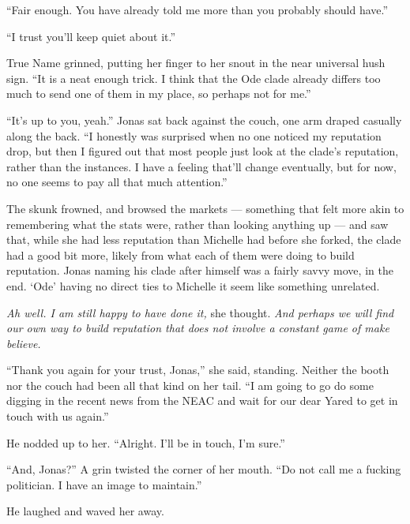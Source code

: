 ``Fair enough. You have already told me more than you probably should have.''

``I trust you'll keep quiet about it.''

True Name grinned, putting her finger to her snout in the near universal hush sign. ``It is a neat enough trick. I think that the Ode clade already differs too much to send one of them in my place, so perhaps not for me.''

``It's up to you, yeah.'' Jonas sat back against the couch, one arm draped casually along the back. ``I honestly was surprised when no one noticed my reputation drop, but then I figured out that most people just look at the clade's reputation, rather than the instances. I have a feeling that'll change eventually, but for now, no one seems to pay all that much attention.''

The skunk frowned, and browsed the markets — something that felt more akin to remembering what the stats were, rather than looking anything up — and saw that, while she had less reputation than Michelle had before she forked, the clade had a good bit more, likely from what each of them were doing to build reputation. Jonas naming his clade after himself was a fairly savvy move, in the end. `Ode' having no direct ties to Michelle it seem like something unrelated.

\emph{Ah well. I am still happy to have done it,} she thought. \emph{And perhaps we will find our own way to build reputation that does not involve a constant game of make believe.}

``Thank you again for your trust, Jonas,'' she said, standing. Neither the booth nor the couch had been all that kind on her tail. ``I am going to go do some digging in the recent news from the NEAC and wait for our dear Yared to get in touch with us again.''

He nodded up to her. ``Alright. I'll be in touch, I'm sure.''

``And, Jonas?'' A grin twisted the corner of her mouth. ``Do not call me a fucking politician. I have an image to maintain.''

He laughed and waved her away.
